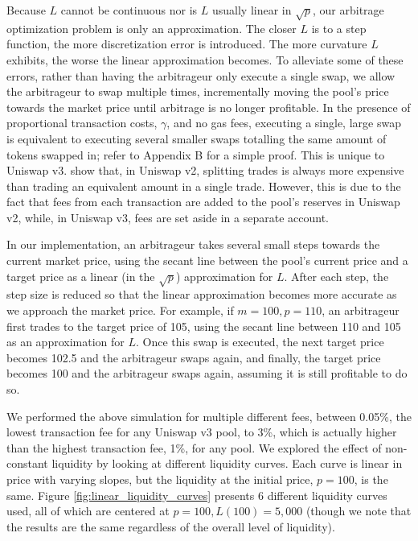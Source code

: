 \documentclass[11pt]{article}
\begin{document}
Because $L$ cannot be continuous nor is $L$ usually linear in $\sqrt{p}$, our arbitrage optimization problem is only an approximation. The closer $L$ is to a step function, the more discretization error is introduced. The more curvature $L$ exhibits, the worse the linear approximation becomes. To alleviate some of these errors, rather than having the arbitrageur only execute a single swap, we allow the arbitrageur to swap multiple times, incrementally moving the pool's price towards the market price until arbitrage is no longer profitable. In the presence of proportional transaction costs, $\gamma$, and no gas fees, executing a single, large swap is equivalent to executing several smaller swaps totalling the same amount of tokens swapped in; refer to Appendix B for a simple proof. This is unique to Uniswap v3. \citet{angeris2021analysis} show that, in Uniswap v2, splitting trades is always more expensive than trading an equivalent amount in a single trade. However, this is due to the fact that fees from each transaction are added to the pool's reserves in Uniswap v2, while, in Uniswap v3, fees are set aside in a separate account.

In our implementation, an arbitrageur takes several small steps towards the current market price, using the secant line between the pool's current price and a target price as a linear (in the $\sqrt{p}$) approximation for $L$. After each step, the step size is reduced so that the linear approximation becomes more accurate as we approach the market price. For example, if $m=100, p=110$, an arbitrageur first trades to the target price of 105, using the secant line between 110 and 105 as an approximation for $L$. Once this swap is executed, the next target price becomes 102.5 and the arbitrageur swaps again, and finally, the target price becomes 100 and the arbitrageur swaps again, assuming it is still profitable to do so.

We performed the above simulation for multiple different fees, between 0.05\%, the lowest transaction fee for any Uniswap v3 pool, to 3\%, which is actually higher than the highest transaction fee, 1\%, for any pool. We explored the effect of non-constant liquidity by looking at different liquidity curves. Each curve is linear in price with varying slopes, but the liquidity at the initial price, $p=100$, is the same. Figure \ref{fig:linear_liquidity_curves} presents 6 different liquidity curves used, all of which are centered at $p=100, L(100)=5,000$ (though we note that the results are the same regardless of the overall level of liquidity).
\end{document}
